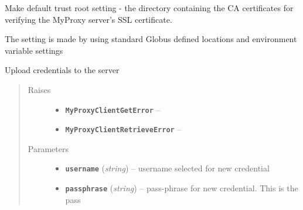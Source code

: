 \documentclass[letterpaper,10pt,english]{sphinxmanual}
\begin{document}
\begin{fulllineitems}
\begin{fulllineitems}
\end{fulllineitems}


\begin{fulllineitems}
\label{client:myproxy.client.MyProxyClient.setDefaultCACertDir}
Make default trust root setting - the directory containing the CA 
certificates for verifying the MyProxy server's SSL certificate.

The setting is made by using standard Globus defined locations and
environment variable settings

\end{fulllineitems}


\begin{fulllineitems}
\label{client:myproxy.client.MyProxyClient.store}
Upload credentials to the server
\begin{quote}\begin{description}
\item[{Raises}] \leavevmode\begin{itemize}
\item {} 
\textbf{\texttt{MyProxyClientGetError}} -- 

\item {} 
\textbf{\texttt{MyProxyClientRetrieveError}} -- 

\end{itemize}

\item[{Parameters}] \leavevmode\begin{itemize}
\item {} 
\textbf{\texttt{username}} (\emph{string}) -- username selected for new credential

\item {} 
\textbf{\texttt{passphrase}} (\emph{string}) -- pass-phrase for new credential.  This is the pass

\end{itemize}

\end{description}\end{quote}


\end{fulllineitems}
\end{fulllineitems}
\end{document}
